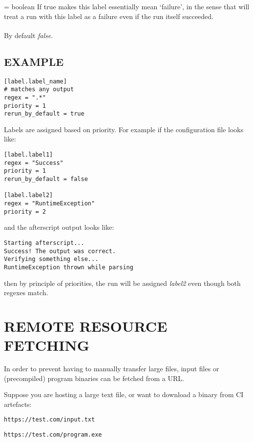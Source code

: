 \documentclass[a4paper,english]{article}
\begin{document}
\begin{adjustwidth}{18pt}{0pt}
\begin{Description}[Options]
          \item[\Opt{rerun\_by\_default?} = boolean]
          If true makes this label essentially mean `failure', in the sense that
           will treat a run with this label as a failure even if the
          run itself succeeded. \\ \\
          By default \emph{false}.
      \end{Description}

      \subsection{EXAMPLE}

          \begin{verbatim}
[label.label_name]
# matches any output
regex = ".*"
priority = 1
rerun_by_default = true
          \end{verbatim}
          Labels are assigned based on priority.
          For example if the configuration file looks like:

          \begin{verbatim}
[label.label1]
regex = "Success"
priority = 1
rerun_by_default = false

[label.label2]
regex = "RuntimeException"
priority = 2
          \end{verbatim}
          and the afterscript output looks like:

          \begin{verbatim}
Starting afterscript...
Success! The output was correct.
Verifying something else...
RuntimeException thrown while parsing
          \end{verbatim}
          then by principle of priorities, the run will be assigned
          \emph{label2} even though both regexes match.

    \section{REMOTE RESOURCE FETCHING}

        In order to prevent having to manually transfer large files, input files
        or (precompiled) program binaries can be fetched from a URL.

        Suppose you are hosting a large text file, or want to download a binary from CI artefacts:

        \texttt{https://test.com/input.txt}

        \texttt{https://test.com/program.exe}


\end{adjustwidth}
\end{document}
